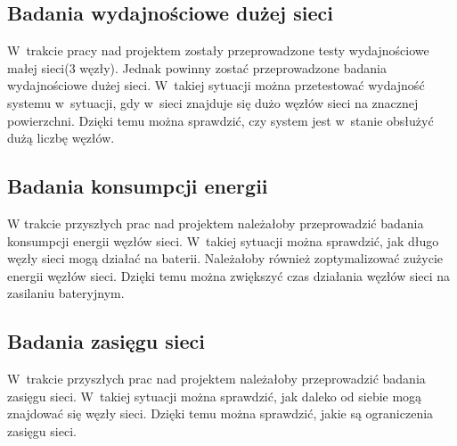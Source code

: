 \subsection{Badania wydajnościowe dużej sieci}
W~trakcie pracy nad projektem zostały przeprowadzone testy wydajnościowe małej sieci(3 węzły). Jednak powinny zostać przeprowadzone badania wydajnościowe dużej sieci. W~takiej sytuacji można przetestować wydajność systemu w~sytuacji, gdy w~sieci znajduje się dużo węzłów sieci na znacznej powierzchni. Dzięki temu można sprawdzić, czy system jest w~stanie obsłużyć dużą liczbę węzłów.

\subsection{Badania konsumpcji energii}
W trakcie przyszłych prac nad projektem należałoby przeprowadzić badania konsumpcji energii węzłów sieci. W~takiej sytuacji można sprawdzić, jak długo węzły sieci mogą działać na baterii. Należałoby również zoptymalizować zużycie energii węzłów sieci. Dzięki temu można zwiększyć czas działania węzłów sieci na zasilaniu bateryjnym.

\subsection{Badania zasięgu sieci}
W~trakcie przyszłych prac nad projektem należałoby przeprowadzić badania zasięgu sieci. W~takiej sytuacji można sprawdzić, jak daleko od siebie mogą znajdować się węzły sieci. Dzięki temu można sprawdzić, jakie są ograniczenia zasięgu sieci.
